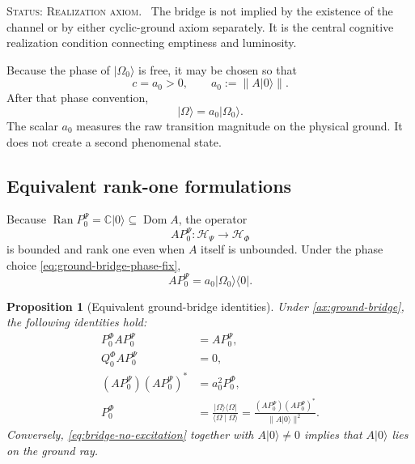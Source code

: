 \documentclass[11pt,reqno]{scrartcl}
\newcommand{\CC}{\mathbb C}
\newcommand{\scrHP}{\mathscr H_{\Psi}}
\newcommand{\scrHF}{\mathscr H_{\Phi}}
\newcommand{\PzeroP}{P_{0}^{\Psi}}
\newcommand{\PzeroF}{P_{0}^{\Phi}}
\newcommand{\QzeroF}{Q_{0}^{\Phi}}
\newcommand{\ket}[1]{\lvert #1\rangle}
\newcommand{\bra}[1]{\langle #1\rvert}
\newcommand{\braket}[2]{\langle #1\mid #2\rangle}
\DeclareMathOperator{\Dom}{Dom}
\DeclareMathOperator{\Ran}{Ran}
\newcommand{\statuslabel}[1]{\par\smallskip\noindent\textsc{Status: #1.}\ }
\theoremstyle{plain}
\newtheorem{proposition}[proposition]{Proposition}
\theoremstyle{definition}
\theoremstyle{remark}
\begin{document}
\statuslabel{Realization axiom} The bridge is not implied by the existence of
the channel or by either cyclic-ground axiom separately.  It is the central
cognitive realization condition connecting emptiness and luminosity.

Because the phase of $\ket{\Omega_0}$ is free, it may be chosen so that
\begin{equation}
  c=a_0>0,
  \qquad
  a_0:=\|A\ket0\|.
  \label{eq:ground-bridge-phase-fix}
\end{equation}
After that phase convention,
\begin{equation}
  \ket\Omega=a_0\ket{\Omega_0}.
  \label{eq:Omega-scaled-Omega0}
\end{equation}
The scalar $a_0$ measures the raw transition magnitude on the physical
ground.  It does not create a second phenomenal state.

\subsection{Equivalent rank-one formulations}

Because $\Ran\PzeroP=\CC\ket0\subseteq\Dom A$, the operator
\begin{equation}
  A\PzeroP:\scrHP\longrightarrow\scrHF
\end{equation}
is bounded and rank one even when $A$ itself is unbounded.  Under the phase
choice \eqref{eq:ground-bridge-phase-fix},
\begin{equation}
  A\PzeroP
  =a_0\ket{\Omega_0}\!\bra0.
  \label{eq:ground-channel-rank-one}
\end{equation}

\begin{proposition}[Equivalent ground-bridge identities]
\label{prop:ground-bridge-equivalences}
Under \cref{ax:ground-bridge}, the following identities hold:
\begin{align}
  \PzeroF A\PzeroP
  &=A\PzeroP,
  \label{eq:bridge-compression}\\
  \QzeroF A\PzeroP
  &=0,
  \label{eq:bridge-no-excitation}\\
  (A\PzeroP)(A\PzeroP)^*
  &=a_0^2\PzeroF,
  \label{eq:bridge-rank-one-product}\\
  \PzeroF
  &=\frac{\ket\Omega\!\bra\Omega}{\braket{\Omega}{\Omega}}
   =\frac{(A\PzeroP)(A\PzeroP)^*}{\|A\ket0\|^2}.
  \label{eq:bridge-projector-formula}
\end{align}
Conversely, \eqref{eq:bridge-no-excitation} together with
$A\ket0\neq0$ implies that $A\ket0$ lies on the ground ray.
\end{proposition}
\end{document}
